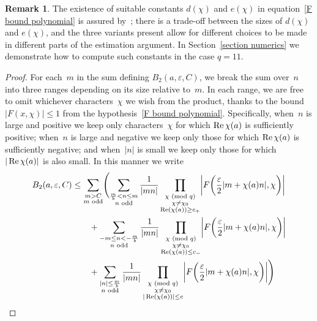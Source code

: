 \documentclass[11pt]{article}
\theoremstyle{plain}
\theoremstyle{definition}
\newtheorem{rem}[thm]{Remark}
\numberwithin{equation}{section}
\renewcommand{\mod}[1]{{\ifmmode\text{\rm\ (mod~$#1$)}\else\discretionary{}{}{\hbox{\!\!}}\rm(mod~$#1$)\fi}}
\renewcommand{\Re}{\mathop{\rm Re}}
\newcommand{\0}{{\vec 0}}
\begin{document}
\begin{rem}
The existence of suitable constants $d(\chi)$ and $e(\chi)$ in equation~\eqref{F bound polynomial} is assured by~\cite[equation~(3.19)]{BSRPNR}; there is a trade-off between the sizes of $d(\chi)$ and $e(\chi)$, and the three variants present allow for different choices to be made in different parts of the estimation argument. In Section~\ref{section numerics} we demonstrate how to compute such constants in the case $q=11$.
\end{rem}

\begin{proof}
For each~$m$ in the sum defining $B_2(a,\varepsilon,C)$, we break the sum over~$n$ into three ranges depending on its size relative to~$m$. In each range, we are free to omit whichever characters~$\chi$ we wish from the product, thanks to the bound $|F(x,\chi)| \le 1$ from the hypothesis~\eqref{F bound polynomial}. Specifically, when~$n$ is large and positive we keep only characters~$\chi$ for which $\Re\chi(a)$ is sufficiently positive; when~$n$ is large and negative we keep only those for which $\Re\chi(a)$ is sufficiently negative; and when~$|n|$ is small we keep only those for which $|\Re\chi(a)|$ is also small.
In this manner we write
\begin{align}
B_2(a,\varepsilon,C) &\le \sum_{\substack{m>C \\ m\text{ odd}}} \Biggl( \sum_{\substack{\frac{m}{b}<n\le m\\ n\text{ odd}}}\frac1{|mn|} \prod_{\substack{\chi \mod{q}\\ \chi\neq \chi_0\\ \Re(\chi(a))\ge c_+}} \biggl| F\biggl( \frac{\varepsilon}{2} |m+\chi(a)n|,\chi \biggr) \biggr| \notag \\
&\qquad{}+\sum_{\substack{-m \le n < -\frac{m}{b} \\ n\text{ odd}}}\frac1{|mn|} \prod_{\substack{\chi \mod{q}\\ \chi\neq \chi_0\\ \Re(\chi(a))\le c_-}} \biggl| F\biggl( \frac{\varepsilon}{2} |m+\chi(a)n|,\chi \biggr) \biggr| \notag \\
&\qquad{}+ \sum_{{\substack{|n| \le \frac{m}{b}\\ n\text{ odd}}}}\frac1{|mn|} \prod_{\substack{\chi \mod{q}\\ \chi\neq \chi_0 \\ |\Re(\chi(a))|\le c}} \biggl| F\biggl( \frac{\varepsilon}{2} |m+\chi(a)n|,\chi \biggr) \biggr| \Biggr) \notag \\

\end{align}
\end{proof}
\end{document}
